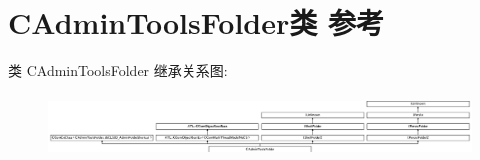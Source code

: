 \hypertarget{class_c_admin_tools_folder}{}\section{C\+Admin\+Tools\+Folder类 参考}
\label{class_c_admin_tools_folder}
类 C\+Admin\+Tools\+Folder 继承关系图\+:\begin{figure}[H]
\begin{center}
\leavevmode
\includegraphics[height=1.682692cm]{class_c_admin_tools_folder}
\end{center}
\end{figure}
